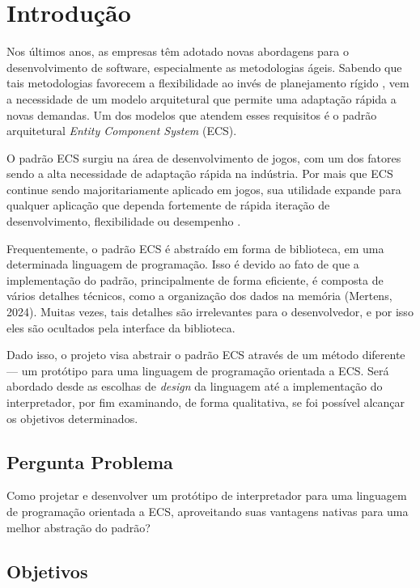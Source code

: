 \chapter{Introdução}\label{ch:introducao}

Nos últimos anos, as empresas têm adotado novas abordagens para o desenvolvimento de software, especialmente as metodologias ágeis. Sabendo que tais metodologias favorecem a flexibilidade ao invés de planejamento rígido \cite{agile}, vem a necessidade de um modelo arquitetural que permite uma adaptação rápida a novas demandas. Um dos modelos que atendem esses requisitos é o padrão arquitetural \textit{Entity Component System} (ECS).

O padrão ECS surgiu na área de desenvolvimento de jogos, com um dos fatores sendo a alta necessidade de adaptação rápida na indústria. Por mais que ECS continue sendo majoritariamente aplicado em jogos, sua utilidade expande para qualquer aplicação que dependa fortemente de rápida iteração de desenvolvimento, flexibilidade ou desempenho \cite{flightdynamics}.

Frequentemente, o padrão ECS é abstraído em forma de biblioteca, em uma determinada linguagem de programação. Isso é devido ao fato de que a implementação do padrão, principalmente de forma eficiente, é composta de vários detalhes técnicos, como a organização dos dados na memória (Mertens, 2024). Muitas vezes, tais detalhes são irrelevantes para o desenvolvedor, e por isso eles são ocultados pela interface da biblioteca.

Dado isso, o projeto visa abstrair o padrão ECS através de um método diferente — um protótipo para uma linguagem de programação orientada a ECS. Será abordado desde as escolhas de \textit{design} da linguagem até a implementação do interpretador, por fim examinando, de forma qualitativa, se foi possível alcançar os objetivos determinados.

\section{Pergunta Problema}

Como projetar e desenvolver um protótipo de interpretador para uma linguagem de programação orientada a ECS, aproveitando suas vantagens nativas para uma melhor abstração do padrão?

\section{Objetivos} \label{sec:objetivos}


